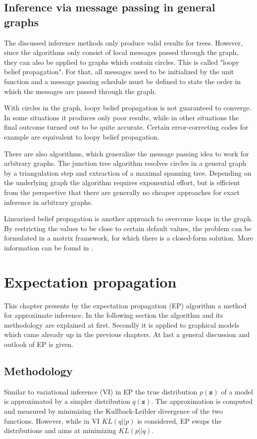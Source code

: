 \documentclass{sigkdd}
\begin{document}
\subsection{Inference via message passing in general graphs}
The discussed inference methods only produce valid results for trees. However, since the algorithms only consist of local messages passed through the graph, they can also be applied to graphs which contain circles. This is called "loopy belief propagation". For that, all messages need to be initialized by the unit function and a message passing schedule must be defined to state the order in which the messages are passed through the graph.

With circles in the graph, loopy belief propagation is not guaranteed to converge. In some situations it produces only poor results, while in other situations the final outcome turned out to be quite accurate. Certain error-correcting codes for example are equivalent to loopy belief propagation.

There are also algorithms, which generalize the message passing idea to work for arbitrary graphs. The junction tree algorithm resolves circles in a general graph by a triangulation step and extraction of a maximal spanning tree. Depending on the underlying graph the algorithm requires exponential effort, but is efficient from the perspective that there are generally no cheaper approaches for exact inference in arbitrary graphs.

Linearized belief propagation is another approach to overcome loops in the graph. By restricting the values to be close to certain default values, the problem can be formulated in a matrix framework, for which there is a closed-form solution. More information can be found in \cite{Gatterbauer:2015:LSB:2735479.2735490}. 

\section{Expectation propagation}\label{chapter:approximate_inference}
This chapter presents by the expectation propagation (EP) algorithm a method for approximate inference. In the following section the algorithm and its methodology are explained at first. Secondly it is applied to graphical models which came already up in the previous chapters. At last a general discussion and outlook of EP is given.

\subsection{Methodology}
Similar to variational inference (VI) in EP the true distribution $p(\mathbf{z})$ of a model is approximated by a simpler distribution $q(\mathbf{z})$. The approximation is computed and measured by minimizing the Kullback-Leibler divergence of the two functions. However, while in VI $KL(q||p)$ is considered, EP swaps the distributions and aims at minimizing $KL(p||q)$.
\end{document}
